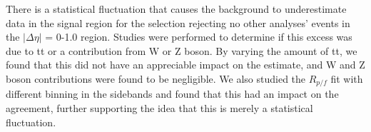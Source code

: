 There is a statistical fluctuation that causes the background to underestimate data in the signal region for the selection rejecting no other analyses' events in the $|\Delta\eta|$ = 0-1.0 region. Studies were performed to determine if this excess was due to tt or a contribution from W or Z boson. By varying the amount of tt, we found that this did not have an appreciable impact on the estimate, and W and Z boson contributions were found to be negligible. We also studied the $R_{p/f}$ fit with different binning in the sidebands and found that this had an impact on the agreement, further supporting the idea that this is merely a statistical fluctuation.


